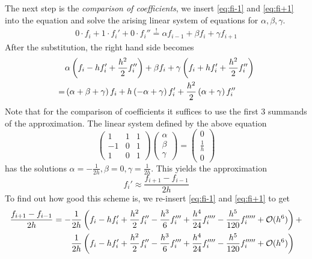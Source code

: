 The next step is the \textit{comparison of coefficients}, we insert
\eqref{eq:fi-1} and \eqref{eq:fi+1} into the equation 
and solve the arising linear system of equations for $\alpha,\beta,\gamma$.
\begin{align}
    0\cdot f_i + 1\cdot f_i' + 0\cdot f_i'' \overset{!}{=} \alpha f_{i-1} + \beta f_i + \gamma
    f_{i+1}
\end{align}
After the substitution, the right hand side becomes
\begin{align}
    &\alpha \left(f_i - hf_i' + \frac{h^2}{2}f_i''\right) + \beta f_i + \gamma\left(f_i + hf_i' + \frac{h^2}{2}f_i''\right)\notag\\
    = &\left(\alpha+\beta+\gamma\right)f_i + h\left(-\alpha+\gamma\right)f_i' + \frac{h^2}{2}\left(\alpha+\gamma\right)f_i''
\end{align} 
Note that for the comparison of coefficients it suffices to use the first 3 summands of the
approximation.
The linear system defined by the above equation
\begin{equation}
    \begin{pmatrix}
        1&1&1\\
        -1&0&1\\
        1&0&1
    \end{pmatrix}
    \begin{pmatrix}
        \alpha\\
        \beta\\
        \gamma
    \end{pmatrix}
    =
    \begin{pmatrix}
        0\\
        \frac{1}{h}\\
        0
    \end{pmatrix}
\end{equation}
has the solutions $\alpha = -\frac{1}{2h}, \beta = 0, \gamma = \frac{1}{2h}$.
This yields the approximation 
\begin{equation}
    f_i'\approx\frac{f_{i+1} - f_{i-1}}{2h}
\end{equation}
To find out how good this scheme is, we re-insert \eqref{eq:fi-1} and \eqref{eq:fi+1} to get
\begin{align}
    \frac{f_{i+1} - f_{i-1}}{2h}= -&\frac{1}{2h}\left(f_i - hf_i' + \frac{h^2}{2}f_i'' - \frac{h^3}{6}f_i''' + \frac{h^4}{24}f_i'''' -
    \frac{h^5}{120}f_i''''' + \mathcal{O}(h^6)\right) + \notag\\
     &\frac{1}{2h}\left(f_i - hf_i' + \frac{h^2}{2}f_i'' - \frac{h^3}{6}f_i''' + \frac{h^4}{24}f_i'''' -
    \frac{h^5}{120}f_i''''' + \mathcal{O}(h^6)\right)\notag
\end{align}
